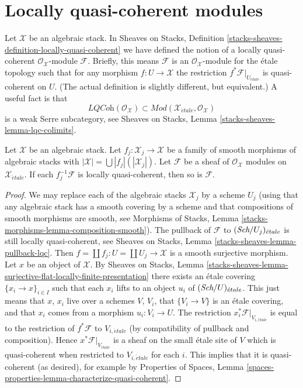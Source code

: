 \section{Locally quasi-coherent modules}
\label{section-locally-quasi-coherent}

\noindent
Let $\mathcal{X}$ be an algebraic stack. In
Sheaves on Stacks, Definition
\ref{stacks-sheaves-definition-locally-quasi-coherent}
we have defined the notion of a locally quasi-coherent
$\mathcal{O}_\mathcal{X}$-module $\mathcal{F}$. Briefly, this means
$\mathcal{F}$ is an $\mathcal{O}_\mathcal{X}$-module for the
\'etale topology such that for any morphism $f : U \to \mathcal{X}$
the restriction $f^*\mathcal{F}|_{U_{\acute{e}tale}}$ is quasi-coherent
on $U$. (The actual definition is slightly different, but equivalent.)
A useful fact is that
$$
\textit{LQCoh}(\mathcal{O}_\mathcal{X}) \subset
\textit{Mod}(\mathcal{X}_{\acute{e}tale}, \mathcal{O}_\mathcal{X})
$$
is a weak Serre subcategory, see
Sheaves on Stacks, Lemma \ref{stacks-sheaves-lemma-lqc-colimits}.

\begin{lemma}
\label{lemma-check-lqc-on-etale-covering}
Let $\mathcal{X}$ be an algebraic stack. Let
$f_j : \mathcal{X}_j \to \mathcal{X}$ be a family of smooth
morphisms of algebraic stacks with
$|\mathcal{X}| =\bigcup |f_j|(|\mathcal{X}_j|)$.
Let $\mathcal{F}$ be a sheaf of $\mathcal{O}_\mathcal{X}$ modules
on $\mathcal{X}_{\acute{e}tale}$. If each $f_j^{-1}\mathcal{F}$
is locally quasi-coherent, then so is $\mathcal{F}$.
\end{lemma}

\begin{proof}
We may replace each of the algebraic stacks $\mathcal{X}_j$ by
a scheme $U_j$ (using that any algebraic stack has a smooth covering by
a scheme and that compositions of smooth morphisms are smooth, see
Morphisms of Stacks, Lemma \ref{stacks-morphisms-lemma-composition-smooth}).
The pullback of $\mathcal{F}$ to $(\textit{Sch}/U_j)_{\acute{e}tale}$ is still
locally quasi-coherent, see
Sheaves on Stacks, Lemma \ref{stacks-sheaves-lemma-pullback-lqc}.
Then $f = \coprod f_j : U = \coprod U_j \to \mathcal{X}$ is a smooth surjective
morphism. Let $x$ be an object of $\mathcal{X}$. By
Sheaves on Stacks, Lemma
\ref{stacks-sheaves-lemma-surjective-flat-locally-finite-presentation}
there exists an \'etale covering $\{x_i \to x\}_{i \in I}$
such that each $x_i$ lifts to an object $u_i$ of $(\textit{Sch}/U)_{\acute{e}tale}$.
This just means that $x$, $x_i$ live over a schemes $V$, $V_i$, that
$\{V_i \to V\}$ is an \'etale covering, and that $x_i$ comes from
a morphism $u_i : V_i \to U$. The restriction
$x_i^*\mathcal{F}|_{V_{i, \acute{e}tale}}$ is equal to the restriction
of $f^*\mathcal{F}$ to $V_{i, \acute{e}tale}$ (by compatibility of
pullback and composition). Hence $x^*\mathcal{F}|_{V_{\acute{e}tale}}$
is a sheaf on the small \'etale site of $V$ which is quasi-coherent
when restricted to $V_{i, \acute{e}tale}$ for each $i$.
This implies that it is quasi-coherent (as desired), for example by
Properties of Spaces, Lemma
\ref{spaces-properties-lemma-characterize-quasi-coherent}.
\end{proof}

